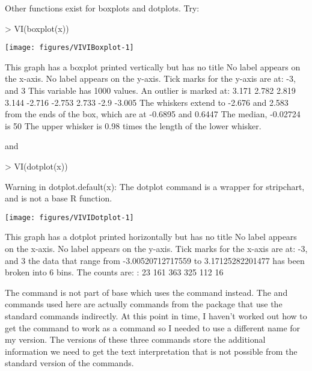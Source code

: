  
Other functions exist for boxplots and dotplots. Try: 
\begin{Schunk}
\begin{Sinput}
> VI(boxplot(x)) 
\end{Sinput}

\texttt{[image: figures/VIVIBoxplot-1]} \begin{Soutput}
This graph has a boxplot printed vertically
but has no title
No label appears on the x-axis.
No label appears on the y-axis.
Tick marks for the y-axis are at: -3, and 3 
This variable has 1000 values.
An outlier is marked at: 3.171 2.782 2.819 3.144 -2.716 -2.753 2.733 -2.9 -3.005 
The whiskers extend to -2.676 and 2.583 from the ends of the box, 
which are at -0.6895 and 0.6447 
The median, -0.02724 is 50 % from the lower end of the box to the upper end.
The upper whisker is 0.98 times the length of the lower whisker.
\end{Soutput}
\end{Schunk}
 and 
\begin{Schunk}
\begin{Sinput}
> VI(dotplot(x)) 
\end{Sinput}
\begin{Soutput}
Warning in dotplot.default(x): The dotplot command is a wrapper for stripchart, and is not a base R function.
\end{Soutput}

\texttt{[image: figures/VIVIDotplot-1]} \begin{Soutput}
This graph has a dotplot printed horizontally
but has no title
No label appears on the x-axis.
No label appears on the y-axis.
Tick marks for the x-axis are at: -3, and 3 
the data that range from -3.00520712717559 to 3.17125282201477 has been broken into 6 bins.
The counts are:
: 23 161 363 325 112 16 
\end{Soutput}
\end{Schunk}
 
The  command is not part of base \R{} which uses the  command instead. The  and  commands used here are actually commands from the  package that use the standard commands indirectly. At this point in time, I haven't worked out how to get the  command to work as a  command so I needed to use a different name for my version. The  versions of these three commands store the additional information we need to get the text interpretation that is not possible from the standard version of the commands. 
 
